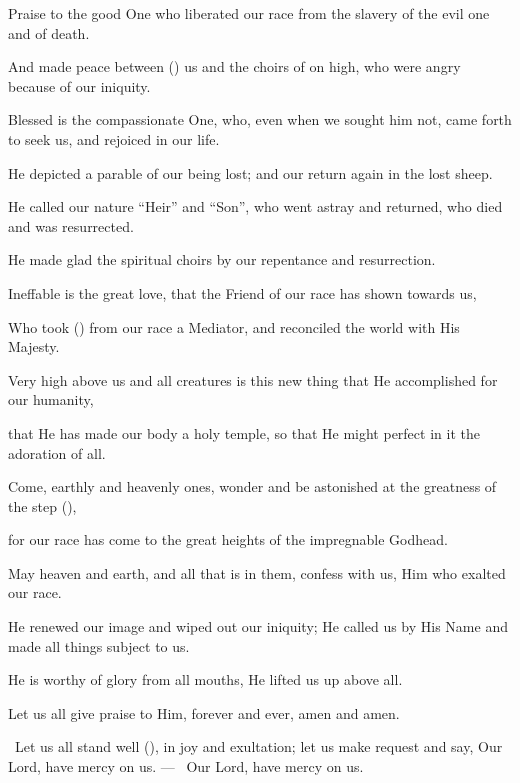 \documentclass[12pt,twoside,a5paper]{article}
\begin{document}
\begin{halfparskip}
  Praise to the good One who liberated our race from the slavery of the evil one and of death.

  And made peace between () us and the choirs of on high, who were angry because of our iniquity.

  Blessed is the compassionate One, who, even when we sought him not, came forth to seek us, and rejoiced in our life.

  He depicted a parable of our being lost; and our return again in the lost sheep.

  He called our nature ``Heir'' and ``Son'', who went astray and returned, who died and was resurrected.

  He made glad the spiritual choirs by our repentance and resurrection.

  Ineffable is the great love, that the Friend of our race has shown towards us,

  Who took () from our race a Mediator, and reconciled the world with His Majesty.

  Very high above us and all creatures is this new thing that He accomplished for our humanity,

  that He has made our body a holy temple, so that He might perfect in it the adoration of all.

  Come, earthly and heavenly ones, wonder and be astonished at the greatness of the step (),

  for our race has come to the great heights of the impregnable Godhead.

  May heaven and earth, and all that is in them, confess with us, Him who exalted our race.

  He renewed our image and wiped out our iniquity; He called us by His Name and made all things subject to us.

  He is worthy of glory from all mouths, He lifted us up above all.

  Let us all give praise to Him, forever and ever, amen and amen.
\end{halfparskip}




\dd~Let us all stand well (), in joy and exultation; let us make request and say, Our Lord, have mercy on us. --- \rr~Our Lord, have mercy on us. 
\end{document}
